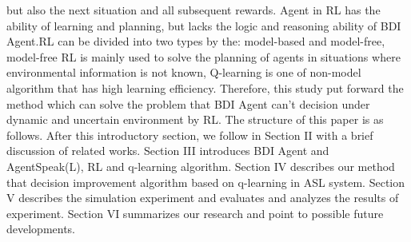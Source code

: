 \documentclass{article}
\begin{document}
but also the next situation and all subsequent rewards. Agent in
RL has the ability of learning and planning, but lacks the logic
and reasoning ability of BDI Agent.RL can be divided into two
types by the: model-based and model-free, model-free RL is
mainly used to solve the planning of agents in situations where
environmental information is not known, Q-learning is one of
non-model algorithm that has high learning efficiency.
Therefore, this study put forward the method which can solve the
problem that BDI Agent can't decision under dynamic and
uncertain environment by RL.
The structure of this paper is as follows. After this introductory
section, we follow in Section II with a brief discussion of related
works. Section III introduces BDI Agent and AgentSpeak(L), RL
and q-learning algorithm. Section IV describes our method that
decision improvement algorithm based on q-learning in ASL
system. Section V describes the simulation experiment and
evaluates and analyzes the results of experiment. Section VI
summarizes our research and point to possible future developments.
\end{document}
